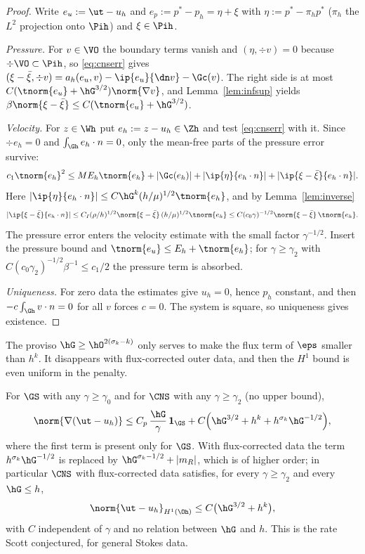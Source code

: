 \begin{proof}
Write $e_u:=\ut-u_h$ and $e_p:=p^\ast-p_h=\eta+\xi$ with $\eta:=p^\ast-\pi_hp^\ast$ ($\pi_h$ the $L^2$ projection onto $\Pih$) and $\xi\in\Pih$.

\emph{Pressure.} For $v\in\VO$ the boundary terms vanish and $(\eta,\div v)=0$ because $\div\VO\subset\Pih$, so \eqref{eq:cnserr} gives $(\xi-\bar\xi,\div v)=a_h(e_u,v)-\ip{e_u}{\dn v}-\Gc(v)$. The right side is at most $C(\tnorm{e_u}+\hG^{3/2})\norm{\nabla v}$, and Lemma~\ref{lem:infsup} yields $\beta\norm{\xi-\bar\xi}\le C(\tnorm{e_u}+\hG^{3/2})$.

\emph{Velocity.} For $z\in\Wh$ put $e_h:=z-u_h\in\Zh$ and test \eqref{eq:cnserr} with it. Since $\div e_h=0$ and $\int_{\Gh}e_h\cdot n=0$, only the mean-free parts of the pressure error survive:
\[
c_1\tnorm{e_h}^2\le ME_h\tnorm{e_h}+|\Gc(e_h)|+|\ip{\eta}{e_h\cdot n}|+|\ip{\xi-\bar\xi}{e_h\cdot n}| .
\]
Here $|\ip{\eta}{e_h\cdot n}|\le C\hG^k(h/\mu)^{1/2}\tnorm{e_h}$, and by Lemma~\ref{lem:inverse}
\[
|\ip{\xi-\bar\xi}{e_h\cdot n}|\le C_I(\rho/h)^{1/2}\norm{\xi-\bar\xi}\,(h/\mu)^{1/2}\tnorm{e_h}\le C(c_0\gamma)^{-1/2}\norm{\xi-\bar\xi}\,\tnorm{e_h}.
\]
The pressure error enters the velocity estimate with the small factor $\gamma^{-1/2}$. Insert the pressure bound and $\tnorm{e_u}\le E_h+\tnorm{e_h}$; for $\gamma\ge\gamma_2$ with $C(c_0\gamma_2)^{-1/2}\beta^{-1}\le c_1/2$ the pressure term is absorbed.

\emph{Uniqueness.} For zero data the estimates give $u_h=0$, hence $p_h$ constant, and then $-c\int_{\Gh}v\cdot n=0$ for all $v$ forces $c=0$. The system is square, so uniqueness gives existence.
\end{proof}

The proviso $\hG\ge\hO^{2(\sigma_k-k)}$ only serves to make the flux term of $\eps$ smaller than $h^k$. It disappears with flux-corrected outer data, and then the $H^1$ bound is even uniform in the penalty.

\begin{theorem}\label{thm:unif}
For $\GS$ with any $\gamma\ge\gamma_0$ and for $\CNS$ with any $\gamma\ge\gamma_2$ (no upper bound),
\[
\norm{\nabla(\ut-u_h)}\le C_p\,\frac{\hG}{\gamma}\,\mathbf 1_{\GS}+C\Bigl(\hG^{3/2}+h^k+h^{\sigma_k}\hG^{-1/2}\Bigr),
\]
where the first term is present only for $\GS$. With flux-corrected data the term $h^{\sigma_k}\hG^{-1/2}$ is replaced by $\hG^{\sigma_k-1/2}+|m_R|$, which is of higher order; in particular $\CNS$ with flux-corrected data satisfies, for every $\gamma\ge\gamma_2$ and every $\hG\le h$,
\[
\norm{\ut-u_h}_{H^1(\Oh)}\le C\bigl(\hG^{3/2}+h^k\bigr),
\]
with $C$ independent of $\gamma$ and no relation between $\hG$ and $h$. This is the rate Scott conjectured, for general Stokes data.
\end{theorem}

